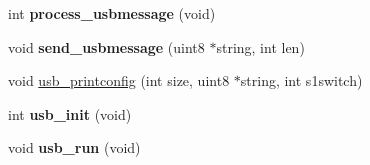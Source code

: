 \begin{DoxyCompactItemize}
\item 
\hypertarget{group__USB__VCP__Private__Variables_gaee259a90bf8302ca162a7f70c7e708bf}{int {\bfseries process\-\_\-usbmessage} (void)}\label{group__USB__VCP__Private__Variables_gaee259a90bf8302ca162a7f70c7e708bf}

\item 
\hypertarget{group__USB__VCP__Private__Variables_ga19ef21815696bf0976c1f824f04d700f}{void {\bfseries send\-\_\-usbmessage} (uint8 $\ast$string, int len)}\label{group__USB__VCP__Private__Variables_ga19ef21815696bf0976c1f824f04d700f}

\item 
void \hyperlink{group__USB__VCP__Private__Variables_gaf2622d49bb9b422ba14489aae673e1dc}{usb\-\_\-printconfig} (int size, uint8 $\ast$string, int s1switch)
\item 
\hypertarget{group__USB__VCP__Private__Variables_gae227d2d613cf288a240925ac43baea5f}{int {\bfseries usb\-\_\-init} (void)}\label{group__USB__VCP__Private__Variables_gae227d2d613cf288a240925ac43baea5f}

\item 
\hypertarget{group__USB__VCP__Private__Variables_ga5a091f83ce73e386ae2f934aa5d6d40b}{void {\bfseries usb\-\_\-run} (void)}\label{group__USB__VCP__Private__Variables_ga5a091f83ce73e386ae2f934aa5d6d40b}

\end{DoxyCompactItemize}

